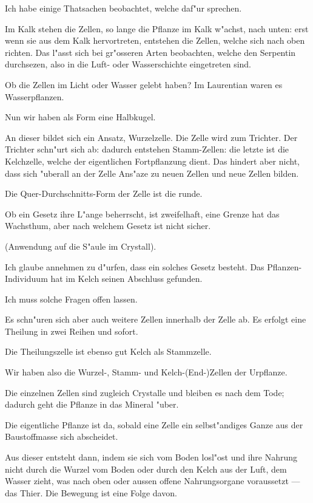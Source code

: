 \documentclass[a4paper, 11pt, oneside, german]{article}
\begin{document}
Ich habe einige Thatsachen beobachtet, welche daf"ur sprechen.

Im Kalk stehen die Zellen, so lange die Pflanze im Kalk w"achst, nach unten: erst wenn sie aus dem Kalk hervortreten, entstehen die Zellen, welche sich nach oben richten. Das l"asst sich bei gr"osseren Arten beobachten, welche den Serpentin durchsezen, also in die Luft- oder Wasserschichte eingetreten sind.

Ob die Zellen im Licht oder Wasser gelebt haben? Im Laurentian waren es Wasserpflanzen.

Nun wir haben als Form eine Halbkugel.

An dieser bildet sich ein Ansatz, Wurzelzelle. Die Zelle wird zum Trichter. Der Trichter schn"urt sich ab: dadurch entstehen Stamm-Zellen: die letzte ist die Kelchzelle, welche der eigentlichen Fortpflanzung dient. Das hindert aber nicht, dass sich "uberall an der Zelle Ans"aze zu neuen Zellen und neue Zellen bilden.

Die Quer-Durchschnitts-Form der Zelle ist die runde.

Ob ein Gesetz ihre L"ange beherrscht, ist zweifelhaft, eine Grenze hat das Wachsthum, aber nach welchem Gesetz ist nicht sicher.

(Anwendung auf die S"aule im Crystall).

Ich glaube annehmen zu d"urfen, dass ein solches Gesetz besteht. Das Pflanzen-Individuum hat im Kelch seinen Abschluss gefunden.

Ich muss solche Fragen offen lassen.

Es schn"uren sich aber auch weitere Zellen innerhalb der Zelle ab. Es erfolgt eine Theilung in zwei Reihen und sofort.

Die Theilungszelle ist ebenso gut Kelch als Stammzelle.

Wir haben also die Wurzel-, Stamm- und Kelch-(End-)Zellen der Urpflanze.

Die einzelnen Zellen sind zugleich Crystalle und bleiben es nach dem Tode; dadurch geht die Pflanze in das Mineral "uber.

Die eigentliche Pflanze ist da, sobald eine Zelle ein selbst"andiges Ganze aus der Baustoffmasse sich abscheidet.

Aus dieser entsteht dann, indem sie sich vom Boden losl"ost und ihre Nahrung nicht durch die Wurzel vom Boden oder durch den Kelch aus der Luft, dem Wasser zieht, was nach oben oder aussen offene Nahrungsorgane voraussetzt --- das Thier. Die Bewegung ist eine Folge davon.
\end{document}
